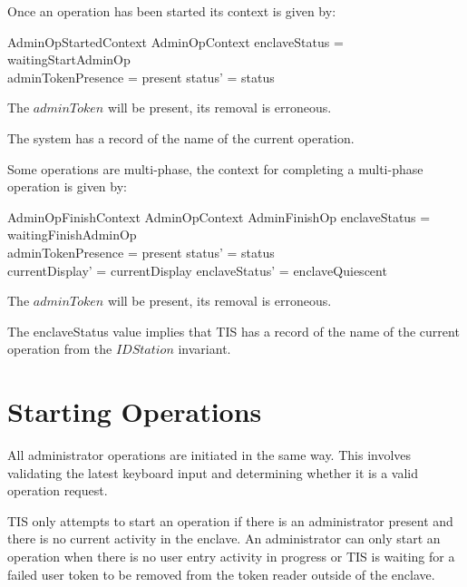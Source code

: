 Once an operation has been started its context is given by:

\begin{schema}{AdminOpStartedContext}
        AdminOpContext
\where
        enclaveStatus = waitingStartAdminOp
\\      adminTokenPresence = present
\also
        status' = status
\end{schema}
\begin{Zcomment}
\item
The $adminToken$ will be present, its removal is erroneous.
\item
The system has a record of the name of the current operation.
\end{Zcomment}

Some operations are multi-phase, the context for completing a
multi-phase operation is given by: 

\begin{schema}{AdminOpFinishContext}
        AdminOpContext
\also
        AdminFinishOp
\where
        enclaveStatus = waitingFinishAdminOp
\\      adminTokenPresence = present
\also
        status' = status
\\      currentDisplay' = currentDisplay
\also
        enclaveStatus' = enclaveQuiescent
\end{schema}
\begin{Zcomment}
\item
The $adminToken$ will be present, its removal is erroneous.
\item
The enclaveStatus value implies that TIS has a record of the name of the
current operation from the $IDStation$ invariant.
\end{Zcomment}


\section{Starting Operations}



All administrator operations are initiated in the same way. This
involves validating the latest keyboard input and determining whether
it is a valid operation request.

TIS only attempts to start an operation if there is an administrator
present and there is no current activity in the enclave.
An administrator can only start an operation when there is no user
entry activity in progress or TIS is waiting for a failed user token 
to be removed from the token reader outside of the enclave.

